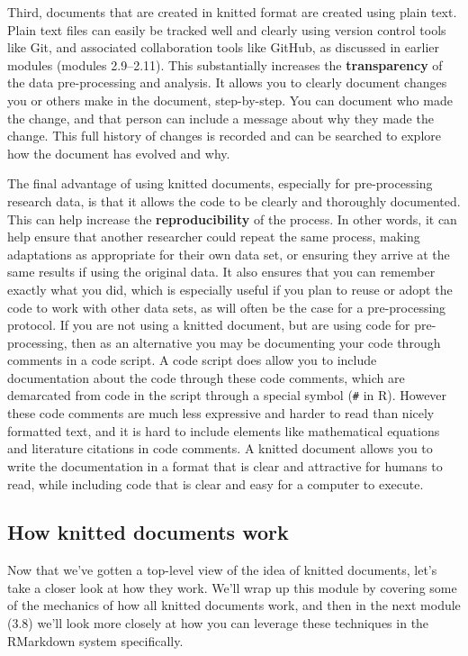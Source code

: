 \documentclass[]{tufte-book}
\begin{document}
Third, documents that are created in knitted format are created using plain
text. Plain text files can easily be tracked well and clearly using version
control tools like Git, and associated collaboration tools like GitHub, as
discussed in earlier modules (modules 2.9--2.11). This substantially increases the \textbf{transparency}
of the data pre-processing and analysis. It allows you to clearly document
changes you or others make in the document, step-by-step. You can document who
made the change, and that person can include a message about why they made the
change. This full history of changes is recorded and can be searched to explore
how the document has evolved and why.

The final advantage of using knitted documents, especially for pre-processing
research data, is that it allows the code to be clearly and thoroughly
documented. This can help increase the \textbf{reproducibility} of the process. In
other words, it can help ensure that another researcher could repeat the same
process, making adaptations as appropriate for their own data set, or ensuring
they arrive at the same results if using the original data. It also ensures that
you can remember exactly what you did, which is especially useful if you plan to
reuse or adopt the code to work with other data sets, as will often be the case
for a pre-processing protocol. If you are not using a knitted document, but are
using code for pre-processing, then as an alternative you may be documenting your
code through comments in a code script. A code script does allow you to include
documentation about the code through these code comments, which are demarcated
from code in the script through a special symbol (\texttt{\#} in R). However these code
comments are much less expressive and harder to read than nicely formatted text,
and it is hard to include elements like mathematical equations and literature
citations in code comments. A knitted document allows you to write the
documentation in a format that is clear and attractive for humans to read, while
including code that is clear and easy for a computer to execute.

\subsection{How knitted documents work}\label{how-knitted-documents-work}

Now that we've gotten a top-level view of the idea of knitted documents, let's take a
closer look at how they work. We'll wrap up this module by covering some of
the mechanics of how all knitted documents work, and then in the next module (3.8)
we'll look more closely at how you can leverage these techniques in the
RMarkdown system specifically.
\end{document}
